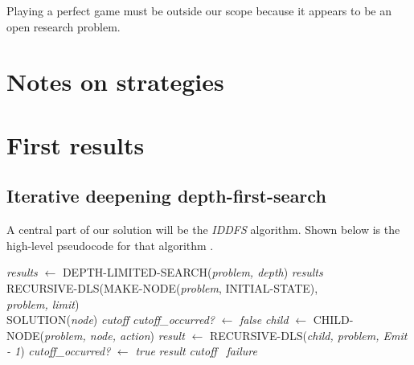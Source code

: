 \documentclass[a4paper,11pt]{article}
\begin{document}
Playing a perfect game must be outside our scope because it appears to
be an open research problem.

\section{Notes on strategies}



\section{First results}


\subsection{Iterative deepening depth-first-search}
A central part of our solution will be the \emph{IDDFS} algorithm.
Shown below is the
high-level pseudocode for that algorithm \cite{aimodern}.\\
\begin{algorithmic}
\State \emph{results} $\gets$ DEPTH-LIMITED-SEARCH(\emph{problem, depth})
\State \Return \emph{results}
\EndIf
\EndFor
\EndFunction
\\
\State \Return RECURSIVE-DLS(MAKE-NODE(\emph{problem}, INITIAL-STATE), \\
\hspace{50mm} \emph{problem, limit})
\EndFunction
\\
\State \Return SOLUTION(\emph{node})
\State \Return \emph{cutoff}
\Else
\State \emph{cutoff\_occurred?} $\gets$ \emph{false}
\State \emph{child} $\gets$ CHILD-NODE(\emph{problem, node, action})
\State \emph{result} $\gets$ RECURSIVE-DLS(\emph{child, problem, Emit - 1})
\State \emph{cutoff\_occurred?} $\gets$ \emph{true}
\State \Return \emph{result}
\EndIf
\EndFor
{}
\Return \emph{cutoff}
\Else
\ \Return \emph{failure}
\EndIf
\EndIf
\EndFunction
\end{algorithmic}
\end{document}
